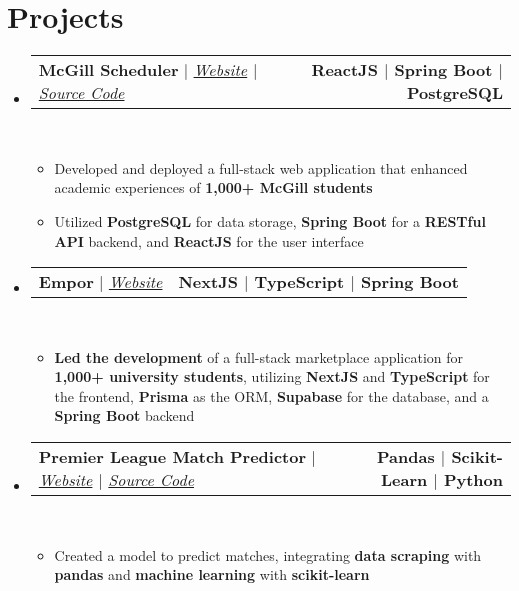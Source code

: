 \documentclass[letterpaper,11pt]{article}
\makeatletter
\newcommand{\resumeItem}[1]{
  \item\small{
    {#1 \vspace{0pt}}
  }
}
\newcommand{\resumeProjectHeading}[2]{
    \item
    \begin{tabular*}{1.001\textwidth}{l@{\extracolsep{\fill}}r}
      \small#1 & \textbf{\small #2}\\
    \end{tabular*}\vspace{-7pt}
}
\newcommand{\resumeSubHeadingListStart}{\begin{itemize}[leftmargin=0.0in, label={}]}
\newcommand{\resumeSubHeadingListEnd}{\end{itemize}}\vspace{0pt}
\newcommand{\resumeItemListStart}{\begin{itemize}}
\newcommand{\resumeItemListEnd}{\end{itemize}\vspace{-5pt}}
\makeatother
\begin{document}
\section{Projects} 
    \vspace{-5pt}
    \resumeSubHeadingListStart
    \resumeProjectHeading
            {\textbf{{McGill Scheduler}} $|$ \emph{\href{https://mcgillscheduler.vercel.app/}{Website}{ $|$ }\href{https://github.com/Erik-Cupsa/McGill-Scheduler}{Source Code}}}{ReactJS $|$ Spring Boot $|$ PostgreSQL}
            \\[5mm]
          \resumeItemListStart
            \resumeItem{Developed and deployed a full-stack web application that enhanced academic experiences of \textbf{1,000+ McGill students}}
            \resumeItem{Utilized \textbf{PostgreSQL} for data storage, \textbf{Spring Boot} for a \textbf{RESTful API} backend, and \textbf{ReactJS} for the user interface}
          \resumeItemListEnd
 \vspace{-20pt}
 \resumeProjectHeading
            {\textbf{{Empor}} $|$ \emph{\href{https://empor.ca/}{Website}}}{NextJS $|$ TypeScript $|$ Spring Boot}
            \\[5mm]
          \resumeItemListStart
            \resumeItem{\textbf{Led the development} of a full-stack marketplace application for \textbf{1,000+ university students}, utilizing \textbf{NextJS} and \textbf{TypeScript} for the frontend, \textbf{Prisma} as the ORM, \textbf{Supabase} for the database, and a \textbf{Spring Boot} backend}
          \resumeItemListEnd
 \vspace{-17pt}
 \resumeProjectHeading
{\textbf{{Premier League Match Predictor}} $|$ \emph{\href{https://premierzone.vercel.app/}{Website}{ $|$ }\href{https://github.com/Erik-Cupsa/PLWebsite}{Source Code}}}{Pandas $|$ Scikit-Learn $|$ Python}
\\[5mm]
\resumeItemListStart
\resumeItem{Created a model to predict matches, integrating \textbf{data scraping} with \textbf{pandas} and \textbf{machine learning} with \textbf{scikit-learn}}
\resumeItemListEnd

\resumeSubHeadingListEnd
\vspace{-28pt}
\end{document}
